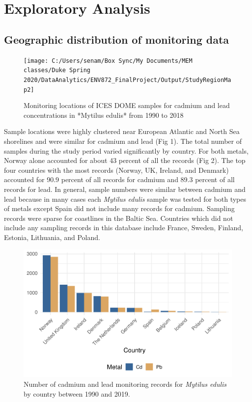 \documentclass[
  12pt,
]{article}
\begin{document}
\newpage

\hypertarget{exploratory-analysis}{%
\section{Exploratory Analysis}\label{exploratory-analysis}}

\hypertarget{geographic-distribution-of-monitoring-data}{%
\subsection{Geographic distribution of monitoring
data}\label{geographic-distribution-of-monitoring-data}}

\begin{figure}
\texttt{[image: C:/Users/senam/Box Sync/My Documents/MEM classes/Duke Spring 2020/DataAnalytics/ENV872\_FinalProject/Output/StudyRegionMap2]} \caption{Monitoring locations of ICES DOME samples for cadmium and lead concentrations in *Mytilus edulis* from 1990 to 2018}\label{fig:unnamed-chunk-1}
\end{figure}

Sample locations were highly clustered near European Atlantic and North
Sea shorelines and were similar for cadmium and lead (Fig 1). The total
number of samples during the study period varied significantly by
country. For both metals, Norway alone accounted for about 43 percent of
all the records (Fig 2). The top four countries with the most records
(Norway, UK, Ireland, and Denmark) accounted for 90.9 percent of all
records for cadmium and 89.3 percent of all records for lead. In
general, sample numbers were similar between cadmium and lead because in
many cases each \emph{Mytilus edulis} sample was tested for both types
of metals except Spain did not include many records for cadmium.
Sampling records were sparse for coastlines in the Baltic Sea. Countries
which did not include any sampling records in this database include
France, Sweden, Finland, Estonia, Lithuania, and Poland.

\begin{figure}
\centering
\includegraphics{McCrory_ENV972_Project_files/figure-latex/unnamed-chunk-2-1.pdf}
\caption{Number of cadmium and lead monitoring records for \emph{Mytilus
edulis} by country between 1990 and 2019.}
\end{figure}
\end{document}
